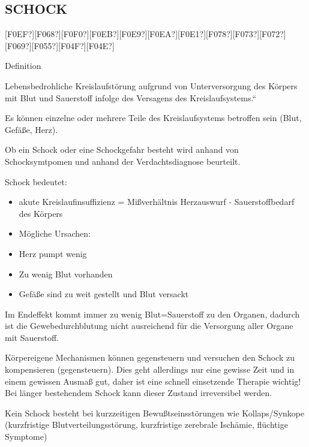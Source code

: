 \documentclass{article}
\begin{document}
\subsection[SCHOCK ]{SCHOCK }
[F0EF?][F068?][F0F0?][F0EB?][F0E9?][F0EA?][F0E1?][F078?][F073?][F072?][F069?][F055?][F04F?][F04E?]

Definition

{\quotedblbase}Lebensbedrohliche Kreislaufst\"orung aufgrund von
Unterversorgung des K\"orpers mit Blut und Sauerstoff infolge des
Versagens des Kreislaufsystems.{\textquotedblleft} 

Es k\"onnen einzelne oder mehrere Teile des Kreislaufsystems betroffen
sein  (Blut, Gef\"a{\ss}e, Herz).

Ob ein Schock oder eine Schockgefahr besteht wird anhand von
Schocksymtpomen und anhand der Verdachtsdiagnose beurteilt.

Schock bedeutet:

\begin{itemize}
\item akute Kreislaufinsuffizienz = Mi{\ss}verh\"altnis Herzauswurf - 
Sauerstoffbedarf des K\"orpers  

\item M\"ogliche Ursachen: 

\end{itemize}
\begin{itemize}
\item Herz pumpt wenig

\item Zu wenig Blut vorhanden 

\item Gef\"a{\ss}e sind zu weit gestellt und Blut versackt

\end{itemize}
Im Endeffekt kommt immer zu wenig Blut=Sauerstoff zu den Organen,
dadurch ist die Ge\-webedurchblutung nicht ausreichend  f\"ur die
Versorgung aller Organe mit Sauer\-stoff.

K\"orpereigene Mechanismen k\"onnen gegensteuern und versuchen den
Schock zu kompensieren (gegensteuern). Dies geht allerdings nur eine
gewisse Zeit und in einem gewissen Ausma{\ss} gut, daher ist eine
schnell  einsetzende Therapie wichtig! Bei l\"anger bestehendem Schock
kann dieser Zustand irreversibel werden. 

Kein Schock besteht bei kurzzeitigen  Bewu{\ss}tseinsst\"orungen wie
Kollaps/Synkope (kurzfristige Blutverteilungsst\"orung, kurzfristige
zerebrale Isch\"amie,  fl\"uchtige Symptome)
\end{document}
